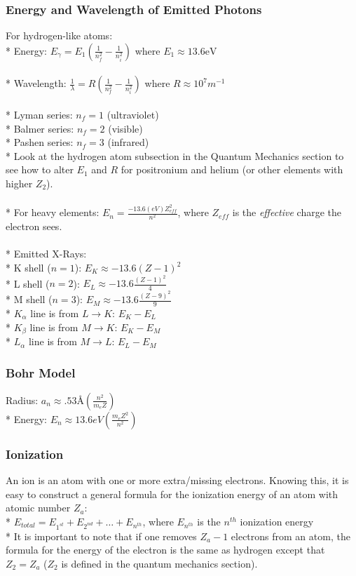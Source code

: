 \subsubsection{Energy and Wavelength of Emitted Photons}
For hydrogen-like atoms:\\*
Energy: \(\displaystyle E_{\gamma}=E_1\left(\frac{1}{n_f^2}-\frac{1}{n_i^2}\right)\) where \(E_1\approx 13.6\mathrm{eV}\)\\\\*
Wavelength: \(\displaystyle \frac{1}{\lambda}=R\left(\frac{1}{n_f^2}-\frac{1}{n_i^2}\right)\) where \(R\approx 10^7 m^{-1}\)\\\\*
Lyman series: \(n_f=1\) (ultraviolet)\\*
Balmer series: \(n_f=2\) (visible)\\*
Pashen series: \(n_f=3\) (infrared)\\*
Look at the hydrogen atom subsection in the Quantum Mechanics section to see how to alter \(E_1\) and \(R\) for positronium and helium (or other elements with higher \(Z_2\)).\\\\*
For heavy elements: \(\displaystyle E_n=\frac{-13.6(eV)Z_{eff}^2}{n^2}\), where \(Z_{eff}\) is the \emph{effective} charge the electron sees.\\\\*
%
Emitted X-Rays:\\*
K shell (\(n=1\)): \(\displaystyle E_K\approx-13.6\left(Z-1\right)^2\)\\*
L shell (\(n=2\)): \(\displaystyle E_L\approx-13.6\frac{\left(Z-1\right)^2}{4}\)\\*
M shell (\(n=3\)): \(\displaystyle E_M\approx-13.6\frac{\left(Z-9\right)^2}{9}\)\\*
\(K_\alpha\) line is from \(L\rightarrow K\): \(E_K-E_L\)\\*
\(K_\beta\) line is from \(M\rightarrow K\): \(E_K-E_M\)\\*
\(L_\alpha\) line is from \(M\rightarrow L\): \(E_L-E_M\)

\subsubsection{Bohr Model}
Radius: \(a_n\approx.53\mathrm{\text{\AA}} \left(\frac{n^2}{m_eZ}\right)\)\\*
Energy: \(E_n\approx13.6eV\left(\frac{m_eZ^2}{n^2}\right)\)

\subsubsection{Ionization}
An ion is an atom with one or more extra/missing electrons.
Knowing this, it is easy to construct a general formula for the ionization energy of an atom with atomic number \(Z_a\):\\*
\(E_{total}=E_{1^{st}}+E_{2^{nd}}+\ldots+E_{n^{th}}\), where \(E_{n^{th}}\) is the \(n^{th}\) ionization energy\\*
It is important to note that if one removes \(Z_a-1\) electrons from an atom, the formula for the energy of the electron is the same as hydrogen except that \(Z_2=Z_a\) (\(Z_2\) is defined in the quantum mechanics section).

